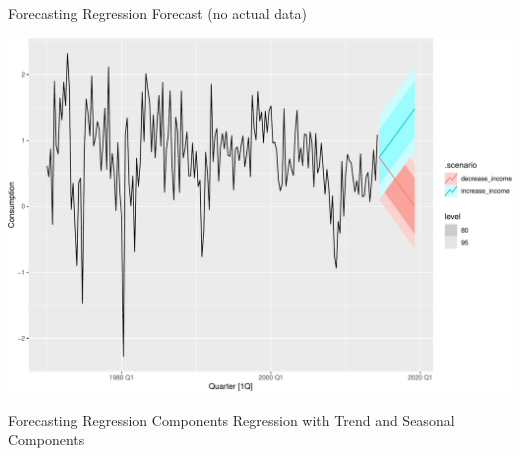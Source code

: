 \documentclass[
  ignorenonframetext,
]{beamer}
\begin{document}
\begin{frame}{Forecasting \textbar{} \small Regression Forecast (no
actual data)}
\protect\hypertarget{forecasting-regression-forecast-no-actual-data-2}{}
\normalfont

\includegraphics{Time-series-regression-models_files/figure-beamer/unnamed-chunk-31-1.pdf}

\normalfont
\end{frame}

\begin{frame}{Forecasting \textbar{} \small Regression Components}
\protect\hypertarget{forecasting-regression-components}{}
\center Regression with Trend and Seasonal Components
\end{frame}
\end{document}
